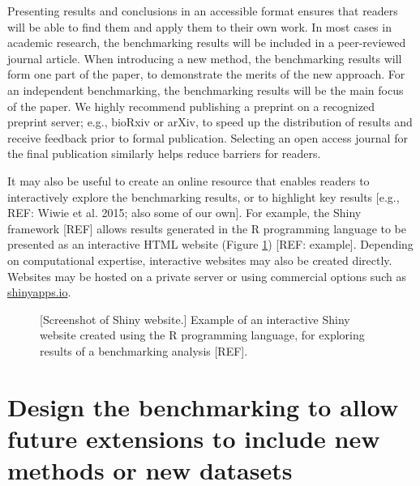 \documentclass[12pt, a4paper]{article}
\begin{document}
Presenting results and conclusions in an accessible format ensures that readers will be able to find them and apply them to their own work. In most cases in academic research, the benchmarking results will be included in a peer-reviewed journal article. When introducing a new method, the benchmarking results will form one part of the paper, to demonstrate the merits of the new approach. For an independent benchmarking, the benchmarking results will be the main focus of the paper. We highly recommend publishing a preprint on a recognized preprint server; e.g., bioRxiv or arXiv, to speed up the distribution of results and receive feedback prior to formal publication. Selecting an open access journal for the final publication similarly helps reduce barriers for readers.

It may also be useful to create an online resource that enables readers to interactively explore the benchmarking results, or to highlight key results [e.g., REF: Wiwie et al. 2015; also some of our own]. For example, the Shiny framework [REF] allows results generated in the R programming language to be presented as an interactive HTML website (Figure \ref{fig:shiny}) [REF: example]. Depending on computational expertise, interactive websites may also be created directly. Websites may be hosted on a private server or using commercial options such as \url{shinyapps.io}.



\vskip 5mm

\begin{figure}[H]
\begin{center}
\end{center}
\caption{[Screenshot of Shiny website.] Example of an interactive Shiny website created using the R programming language, for exploring results of a benchmarking analysis [REF].}
\label{fig:shiny}
\end{figure}




\section{Design the benchmarking to allow future extensions to include new methods or new datasets}
\end{document}
